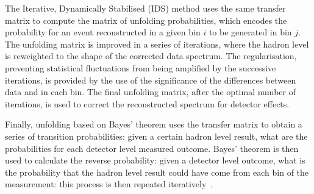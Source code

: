 The Iterative, Dynamically Stabilised (IDS) method uses the same transfer matrix
to compute the matrix of unfolding probabilities, which encodes the probability
for an event reconstructed in a given bin $i$ to be generated in bin $j$. The
unfolding matrix is improved in a series of iterations, where the hadron level \MC is
reweighted to the shape of the corrected data spectrum. The regularisation,
preventing statistical fluctuations from being amplified by the successive
iterations, is provided by the use of the significance of the differences
between data and \MC in each bin. The final unfolding matrix, after the optimal
number of iterations, is used to correct the reconstructed spectrum for detector
effects.

Finally, unfolding based on Bayes' theorem uses the transfer matrix to obtain a
series of transition probabilities: given a certain hadron level result, what are
the probabilities for each detector level measured outcome. Bayes' theorem is then
used to calculate the reverse probability: given a detector level outcome, what
is the probability that the hadron level result could have come from each bin of
the measurement: this process is then repeated iteratively~\cite{DAgostini:2010:BayesianUnfolding}.
